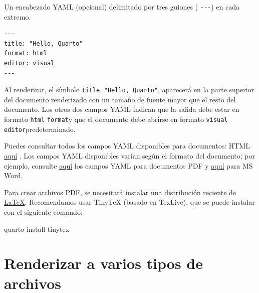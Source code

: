 \documentclass[
  spanish,
  12pt,
  letterpaper,
  DIV=11,
  numbers=noendperiod]{scrreprt}
\newenvironment{Shaded}{\begin{snugshade}}{\end{snugshade}}
\newcommand{\ExtensionTok}[1]{\textcolor[rgb]{0.00,0.23,0.31}{#1}}
\newcommand{\NormalTok}[1]{\textcolor[rgb]{0.00,0.23,0.31}{#1}}
\begin{document}
Un encabezado YAML (opcional) delimitado por tres guiones (
\texttt{-\/-\/-}) en cada extremo.

\begin{verbatim}
---
title: "Hello, Quarto"
format: html
editor: visual
---
\end{verbatim}

Al renderizar, el símbolo \texttt{title}, \texttt{"Hello,\ Quarto"},
aparecerá en la parte superior del documento renderizado con un tamaño
de fuente mayor que el resto del documento. Los otros dos campos YAML
indican que la salida debe estar en formato \texttt{html}
\texttt{format}y que el documento debe abrirse en formato
\texttt{visual} \texttt{editor}predeterminado.

Puedes consultar todos los campos YAML disponibles para documentos: HTML
\href{https://quarto.org/docs/reference/formats/html.html}{aquí} . Los
campos YAML disponibles varían según el formato del documento; por
ejemplo, consulte
\href{https://quarto.org/docs/reference/formats/pdf.html}{aquí} los
campos YAML para documentos PDF y
\href{https://quarto.org/docs/reference/formats/docx.html}{aquí} para MS
Word.

\begin{tcolorbox}[enhanced jigsaw, arc=.35mm, bottomrule=.15mm, bottomtitle=1mm, breakable, colback=white, colbacktitle=quarto-callout-important-color!10!white, colframe=quarto-callout-important-color-frame, coltitle=black, left=2mm, leftrule=.75mm, opacityback=0, opacitybacktitle=0.6, rightrule=.15mm, title=\textcolor{quarto-callout-important-color}{\faExclamation}\hspace{0.5em}{Importante}, titlerule=0mm, toprule=.15mm, toptitle=1mm]

Para crear archivos PDF, se necesitará instalar una distribución
reciente de \href{https://www.latex-project.org/}{LaTeX}. Recomendamos
usar TinyTeX (basado en TexLive), que se puede instalar con el siguiente
comando:

\begin{Shaded}
\begin{Highlighting}[]
\ExtensionTok{quarto}\NormalTok{ install tinytex}
\end{Highlighting}
\end{Shaded}

\end{tcolorbox}

\section{Renderizar a varios tipos de
archivos}\label{renderizar-a-varios-tipos-de-archivos-1}
\end{document}
